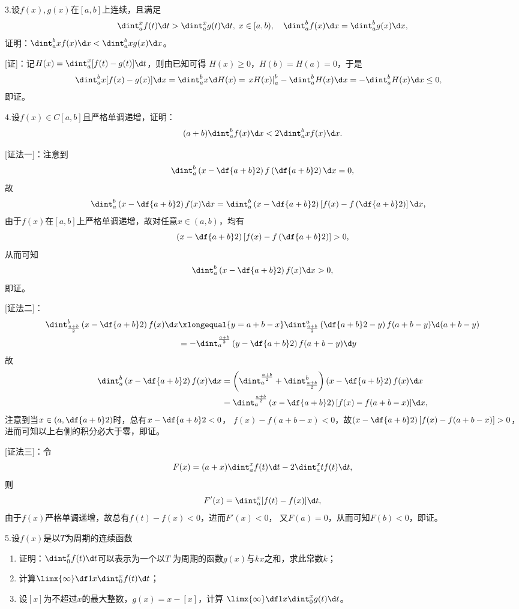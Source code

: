 \bs

3.设$f(x),g(x)$在$[a,b]$上连续，且满足
$$\dint_a^xf(t)\d t>\dint_a^xg(t)\d t,\;x\in[a,b),
\quad \dint_a^bf(x)\d x=\dint_a^bg(x)\d x,$$
证明：$\dint_a^bxf(x)\d x<\dint_a^bxg(x)\d x$。

[证]：记$H(x)=\dint_a^x[f(t)-g(t)]\d t$，则由已知可得
$H(x)\geq 0$，$H(b)=H(a)=0$，于是
\begin{align*}
	\dint_a^bx[f(x)-g(x)]\d x
	&=\dint_a^bx\d H(x)
	=\left.xH(x)\right|_a^b-\dint_a^bH(x)\d x
	=-\dint_a^bH(x)\d x\leq 0,
\end{align*}
即证。\fin

4.设$f(x)\in C[a,b]$且严格单调递增，证明：
$$(a+b)\dint_a^bf(x)\d x<2\dint_a^bxf(x)\d x.$$

[证法一]：注意到
$$\dint_a^b\left(x-\df{a+b}2\right)f\left(\df{a+b}2\right)\d x=0,$$
故
\begin{align*}
	\dint_a^b\left(x-\df{a+b}2\right)f(x)\d x
	&=\dint_a^b\left(x-\df{a+b}2\right)\left[f(x)
	-f\left(\df{a+b}2\right)\right]\d x,
\end{align*}
由于$f(x)$在$[a,b]$上严格单调递增，故对任意$x\in(a,b)$，均有
$$\left(x-\df{a+b}2\right)\left[f(x)
-f\left(\df{a+b}2\right)\right]>0,$$
从而可知
$$\dint_a^b\left(x-\df{a+b}2\right)f(x)\d x>0,$$
即证。\fin

[证法二]：
\begin{align*}
	\dint_{\frac{a+b}2}^b\left(x-\df{a+b}2\right)f(x)\d x
	&\xlongequal{y=a+b-x}\dint_{\frac{a+b}2}^a
	\left(\df{a+b}2-y\right)f(a+b-y)\d (a+b-y)\\
	&=-\dint_a^{\frac{a+b}2}
	\left(y-\df{a+b}2\right)f(a+b-y)\d y
\end{align*}
故
\begin{align*}
	\dint_a^b\left(x-\df{a+b}2\right)f(x)\d x
	&=\left(\dint_a^{\frac{a+b}2}+\dint_{\frac{a+b}2}^b\right)
	\left(x-\df{a+b}2\right)f(x)\d x\\
	&=\dint_a^{\frac{a+b}2}\left(x-\df{a+b}2\right)
	[f(x)-f(a+b-x)]\d x,
\end{align*}
注意到当$x\in\left(a,\df{a+b}2\right)$时，总有$x-\df{a+b}2<0$，
$f(x)-f(a+b-x)<0$，故$\left(x-\df{a+b}2\right)[f(x)-f(a+b-x)]>0$，
进而可知以上右侧的积分必大于零，即证。\fin

[证法三]：令
$$F(x)=(a+x)\dint_a^xf(t)\d t-2\dint_a^xtf(t)\d t,$$
则
$$F'(x)=\dint_a^x[f(t)-f(x)]\d t,$$
由于$f(x)$严格单调递增，故总有$f(t)-f(x)<0$，进而$F'(x)<0$，
又$F(a)=0$，从而可知$F(b)<0$，即证。\fin

5.设$f(x)$是以$T$为周期的连续函数
  \begin{enumerate}[(1)]
    \setlength{\itemindent}{1cm}
    \item 证明：$\dint_0^xf(t)\d t$可以表示为一个以$T$
    为周期的函数$g(x)$与$kx$之和，求此常数$k$；
    \item 计算$\limx{\infty}\df1x\dint_0^xf(t)\d t$；
    \item 设$[x]$为不超过$x$的最大整数，$g(x)=x-[x]$，计算
    $\limx{\infty}\df1x\dint_0^xg(t)\d t$。
  \end{enumerate}

